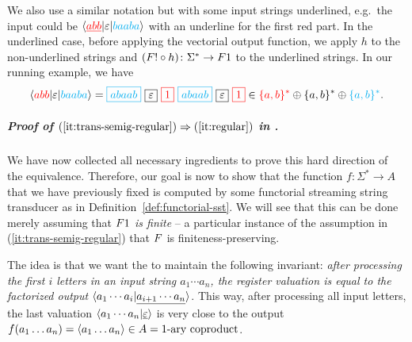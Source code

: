 We also use a similar notation but with some input strings underlined, e.g.~the input could be $\langle {\color{red}\underline{abb}} | \varepsilon | {\color{cyan}baaba} \rangle$ with an underline for the first red part. In the underlined case, before applying the vectorial output function, we apply $h$ to the non-underlined strings and
$(\functor! \circ h) \colon \Sigma^* \to \functor1$
to the underlined strings. In our running example, we have
\begin{align*}
  \tuple{\red{abb} | \varepsilon | \blue{baaba}} =  
  \blue{\boxed{abaab}} \ 
  \boxed{\varepsilon} \ 
  \red{\boxed{1}} \ 
  \blue{\boxed{abaab}} \
  \boxed{\varepsilon} \
  \red{\boxed{1}}
  \in \red{\set{a,b}^*} \oplus \set{a,b}^*  \oplus \blue{\set{a,b}^*}.
\end{align*}

\subparagraph*{Proof of $(\ref{it:trans-semig-regular}) \Rightarrow (\ref{it:regular})$ in .}
We have now collected all necessary ingredients to prove this hard direction of
the equivalence. Therefore, our goal is now to show that the function $f\colon
\Sigma^* \to A$ that we have previously fixed is computed by some functorial
streaming string transducer as in Definition~\ref{def:functorial-sst}.
We will see that this can be done merely assuming that \emph{$\functor 1$ is finite} -- a particular instance of the assumption in (\ref{it:trans-semig-regular}) that $\functor$ is finiteness-preserving.

The idea is that we want the \sst to maintain the following invariant: \emph{after processing the first $i$ letters in an input string $a_1 \cdots a_n$, the register valuation is equal to the factorized output $\langle a_1 \cdots a_i | \underline{a_{i+1} \cdots a_n} \rangle$}. This way, after processing all input letters, the last valuation $\langle a_1 \cdots a_n | \underline{\varepsilon} \rangle$ is very close to the output $f(a_1\dots a_n) = \langle a_1 \dots a_n \rangle \in A = \text{1-ary coproduct}$.

